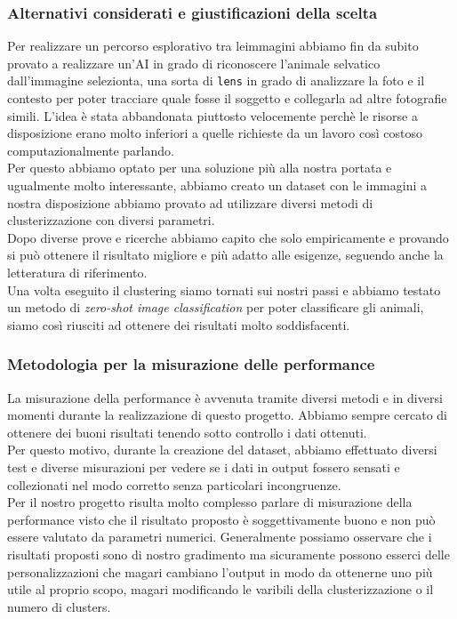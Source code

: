 \documentclass[12pt,a4paper,twoside]{article}
\begin{document}
\subsubsection{Alternativi considerati e giustificazioni della scelta}
Per realizzare un percorso esplorativo tra leimmagini abbiamo fin da subito provato a realizzare 
un'AI in grado di riconoscere l'animale selvatico dall'immagine selezionta, una sorta di 
\texttt{lens} in grado di analizzare la foto e il contesto per poter tracciare quale fosse il 
soggetto e collegarla ad altre fotografie simili. L'idea è stata abbandonata piuttosto 
velocemente perchè le risorse a disposizione erano molto inferiori a quelle richieste da un 
lavoro così costoso computazionalmente parlando.\\
Per questo abbiamo optato per una soluzione più alla nostra portata e ugualmente molto 
interessante, abbiamo creato un dataset con le immagini a nostra disposizione abbiamo provato 
ad utilizzare diversi metodi di clusterizzazione con diversi parametri.\\
Dopo diverse prove e ricerche abbiamo capito che solo empiricamente e provando si può ottenere 
il risultato migliore e più adatto alle esigenze, seguendo anche la letteratura di riferimento.\\
Una volta eseguito il clustering siamo tornati sui nostri passi e abbiamo testato un metodo di 
\textit{zero-shot image classification} per poter classificare gli animali, siamo così riusciti 
ad ottenere dei risultati molto soddisfacenti.

\subsubsection{Metodologia per la misurazione delle performance}
La misurazione della performance è avvenuta tramite diversi metodi e in diversi momenti durante la 
realizzazione di questo progetto. Abbiamo sempre cercato di ottenere dei buoni risultati tenendo 
sotto controllo i dati ottenuti.\\
Per questo motivo, durante la creazione del dataset, abbiamo effettuato diversi test e diverse 
misurazioni per vedere se i dati in output fossero sensati e collezionati nel modo corretto senza 
particolari incongruenze.\\
Per il nostro progetto risulta molto complesso parlare di misurazione della performance visto che 
il risultato proposto è soggettivamente buono e non può essere valutato da parametri numerici. 
Generalmente possiamo osservare che i risultati proposti sono di nostro gradimento ma sicuramente 
possono esserci delle personalizzazioni che magari cambiano l'output in modo da ottenerne uno più 
utile al proprio scopo, magari modificando le varibili della clusterizzazione o il numero di 
clusters.\\
\end{document}
